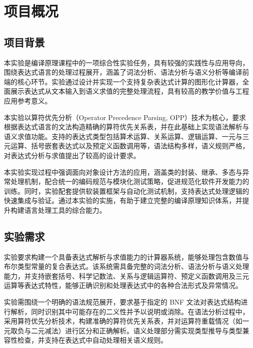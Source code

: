 \documentclass[a4paper, twoside, utf8]{ctexart}
\begin{document}
    \setcounter{page}{1}
	
	\maketitle

    \section{项目概况}

    \subsection{项目背景}

    本实验是编译原理课程中的一项综合性实验任务，具有较强的实践性与应用导向，围绕表达式语言的处理过程展开，涵盖了词法分析、语法分析与语义分析等编译前端的核心环节。实验通过设计并实现一个支持复杂表达式计算的图形化计算器，全面展示表达式从文本输入到语义求值的完整处理流程，具有较高的教学价值与工程应用参考意义。

    本实验以算符优先分析（Operator Precedence Parsing, OPP）技术为核心，要求根据表达式语言的文法构造精确的算符优先关系表，并在此基础上实现语法解析与语义求值功能。支持的表达式类型包括算术运算、关系运算、逻辑运算、一元与三元运算、括号嵌套表达式以及预定义函数调用等，语法结构多样，语义规则严格，对表达式分析与求值提出了较高的设计要求。

    本实验实现过程中强调面向对象设计方法的应用，涵盖类的封装、继承、多态与异常处理机制，配合统一的编码规范与模块化测试策略，促进规范化软件开发能力的训练。同时，实验配套提供软装置框架与自动化测试机制，支持表达式处理逻辑的快速集成与验证。通过本实验的实施，有助于建立完整的编译原理知识体系，并提升构建语言处理工具的综合能力。

    \subsection{实验需求}

    实验要求构建一个具备表达式解析与求值能力的计算器系统，能够处理包含数值与布尔类型常量的复合表达式。该系统需具备完整的词法分析、语法分析与语义处理能力，并支持嵌套括号、科学记数法、关系与逻辑运算符、预定义函数调用及三元运算等表达式特性，能够正确识别和处理表达式中的各种合法形式及异常情况。

    实验需围绕一个明确的语法规范展开，要求基于指定的 BNF 文法对表达式结构进行解析，同时识别其中可能存在的二义性并予以说明或消除。在语法分析过程中，采用算符优先分析技术，构建准确的算符优先关系表，并对运算符重载情况（如一元取负与二元减法）进行区分和正确解析。语义处理部分需实现类型推导与类型兼容性检查，并支持在表达式中自动处理相关语义规则。
    
\end{document}
